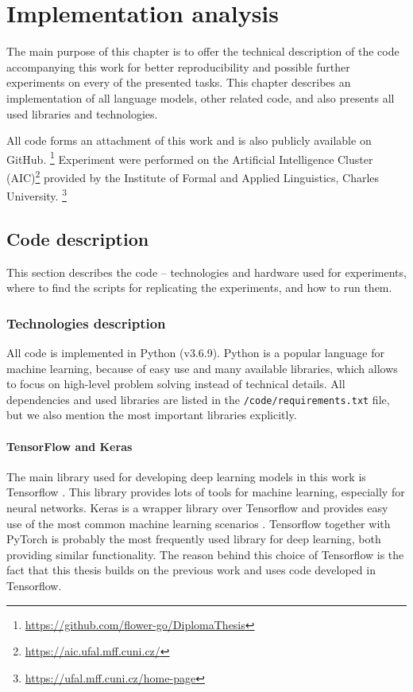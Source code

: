 \chapter{Implementation analysis}
\label{chap:impl}
The main purpose of this chapter is to offer the technical description of the code accompanying this work for better reproducibility and possible further experiments on every of the presented tasks. This chapter describes an implementation of all language models, other related code, and also presents all used libraries and technologies.
\par
All code forms an attachment of this work and is also publicly available on GitHub. \footnote{\url{https://github.com/flower-go/DiplomaThesis}} Experiment were performed on the Artificial Intelligence Cluster (AIC)\footnote{\url{https://aic.ufal.mff.cuni.cz/}} provided by the Institute of Formal and Applied Linguistics, Charles University. \footnote{\url{https://ufal.mff.cuni.cz/home-page}}

\section{Code description}
This section describes the code -- technologies and hardware used for experiments, where to find the scripts for replicating the experiments, and how to run them.
\subsection{Technologies description}
All code is implemented in Python (v3.6.9). Python is a popular language for machine learning, because of easy use and many available libraries, which allows to focus on high-level problem solving instead of technical details. All dependencies and used libraries are listed in the \texttt{/code/requirements.txt} file, but we also mention the most important libraries explicitly.
\subsubsection{TensorFlow and Keras}
The main library used for developing deep learning models in this work is Tensorflow \citep{tensorflow2015-whitepaper}. This library provides lots of tools for machine learning, especially for neural networks. Keras is a wrapper library over Tensorflow and provides easy use of the most common machine learning scenarios \citep{keras}. Tensorflow together with PyTorch \citep{NEURIPS2019_9015} is probably the most frequently used library for deep learning, both providing similar functionality. The reason behind this choice of Tensorflow is the fact that this thesis builds on the previous work and uses code developed in Tensorflow.

